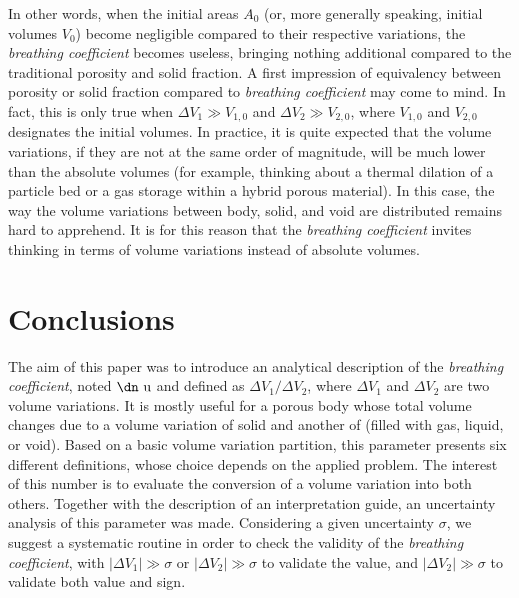 \documentclass[11pt]{article}
\newcommand{\brco}{\textit{breathing coefficient}\xspace}
\newcommand{\DV}[1]{\Delta V_{#1}}
\newcommand{\udan}{\text{\dn u}}
\begin{document}
In other words, when the initial areas $A_0$ (or, more generally speaking,
initial volumes $V_0$) become negligible compared to their respective
variations, the \brco becomes useless, bringing nothing additional compared to
the traditional porosity and solid fraction. A first impression of equivalency
between porosity or solid fraction compared to \brco may come to mind. In
fact, this is only true when $\DV{1} \gg V_{1,0}$ and $\DV{2} \gg V_{2,0}$,
where $V_{1,0}$ and $V_{2,0}$ designates the initial volumes. In practice, it is
quite expected that the volume variations, if they are not at the same order of
magnitude, will be much lower than the absolute volumes (for example, thinking
about a thermal dilation of a particle bed or a gas storage within a hybrid
porous material). In this case, the way the volume variations between body,
solid, and void are distributed remains hard to apprehend. It is for this reason
that the \brco invites thinking in terms of volume variations instead of
absolute volumes.


\section{Conclusions}

The aim of this paper was to introduce an analytical description of the \brco,
noted $\udan$ and defined as $\DV{1} / \DV{2}$, where $\DV{1}$ and $\DV{2}$ are
two volume variations. It is mostly useful for a porous body whose total volume
changes due to a volume variation of solid and another of  (filled
with gas, liquid, or void). Based on a basic volume variation partition, this
parameter presents six different definitions, whose choice depends on the
applied problem. The interest of this number is to evaluate the conversion of a
volume variation into both others. Together with the description of an
interpretation guide, an uncertainty analysis of this parameter was made.
Considering a given uncertainty $\sigma$, we suggest a systematic routine in
order to check the validity of the \brco, with $|\DV{1}| \gg \sigma$ or
$|\DV{2}| \gg \sigma$ to validate the value, and $|\DV{2}| \gg \sigma$ to
validate both value and sign.
\end{document}
